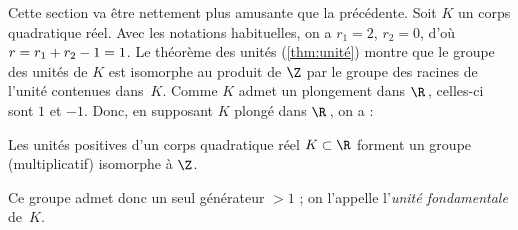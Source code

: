 \documentclass[11pt, useosf,
  title in boldface,
  theorem in new line,
  theorem numbering = section,
  number theorems separately,
]{simplivre}
\begin{document}
    Cette section va être nettement plus amusante que la précédente. Soit \( K \) un corps quadratique réel. Avec les notations habituelles, on a \( r_1 = 2 \), \( r_2 = 0 \), d'où \( r = r_1+r_2-\nobreak 1 =\nobreak 1 \). Le théorème des unités (\cref{thm:unité}) montre que le groupe des unités de \( K \) est isomorphe au produit de \( \Z \) par le groupe des racines de l'unité contenues dans~\( K \). Comme \( K \) admet un plongement dans \( \R \)\,, celles-ci sont \( 1 \) et \( -1 \). Donc, en supposant \( K \) plongé dans \( \R \)\,, on a :
    \begin{proposition}
        Les unités positives d'un corps quadratique réel \( K \subset \R \) forment un groupe (multiplicatif) isomorphe à \( \Z \).
    \end{proposition}
\noindent
    Ce groupe admet donc un seul générateur \( > 1 \) ; on l'appelle l'\emph{unité fondamentale} de~\( K \).
\end{document}
